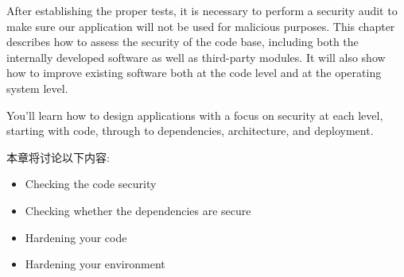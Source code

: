 
After establishing the proper tests, it is necessary to perform a security audit to make sure our application will not be used for malicious purposes. This chapter describes how to assess the security of the code base, including both the internally developed software as well as third-party modules. It will also show how to improve existing software both at the code level and at the operating system level.

You'll learn how to design applications with a focus on security at each level, starting with code, through to dependencies, architecture, and deployment.

本章将讨论以下内容:

\begin{itemize}
\item 
Checking the code security

\item 
Checking whether the dependencies are secure

\item 
Hardening your code

\item 
Hardening your environment
\end{itemize}